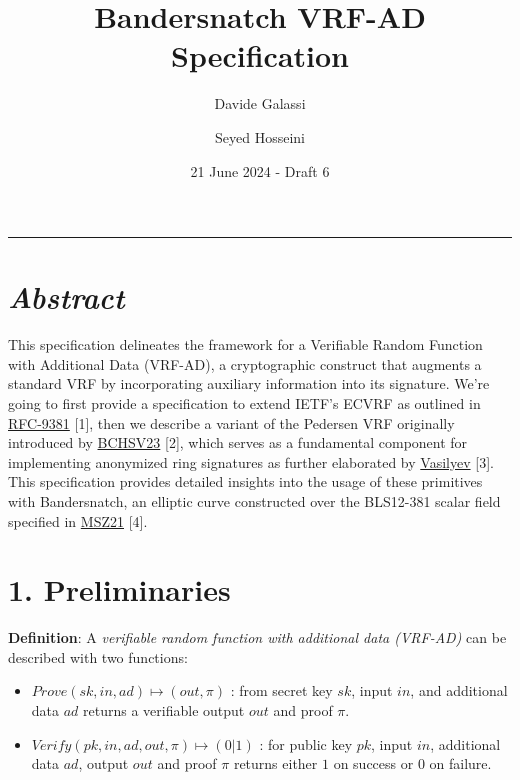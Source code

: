 \documentclass[
]{article}
\title{Bandersnatch VRF-AD Specification}
\author{Davide Galassi \and Seyed Hosseini}
\date{21 June 2024 - Draft 6}
\begin{document}
\maketitle

\newcommand{\G}{\langle G \rangle}
\newcommand{\F}{\mathbb{Z}^*_r}

\begin{center}\rule{0.5\linewidth}{0.5pt}\end{center}

\hypertarget{abstract}{%
\section{\texorpdfstring{\emph{Abstract}}{Abstract}}\label{abstract}}

This specification delineates the framework for a Verifiable Random
Function with Additional Data (VRF-AD), a cryptographic construct that
augments a standard VRF by incorporating auxiliary information into its
signature. We're going to first provide a specification to extend IETF's
ECVRF as outlined in
\href{https://datatracker.ietf.org/doc/rfc9381}{RFC-9381} {[}1{]}, then
we describe a variant of the Pedersen VRF originally introduced by
\href{https://eprint.iacr.org/2023/002}{BCHSV23} {[}2{]}, which serves
as a fundamental component for implementing anonymized ring signatures
as further elaborated by
\href{https://hackmd.io/ulW5nFFpTwClHsD0kusJAA}{Vasilyev} {[}3{]}. This
specification provides detailed insights into the usage of these
primitives with Bandersnatch, an elliptic curve constructed over the
BLS12-381 scalar field specified in
\href{https://eprint.iacr.org/2021/1152}{MSZ21} {[}4{]}.

\hypertarget{preliminaries}{%
\section{1. Preliminaries}\label{preliminaries}}

\textbf{Definition}: A \emph{verifiable random function with additional
data (VRF-AD)} can be described with two functions:

\begin{itemize}
\item
  \(Prove(sk,in,ad) \mapsto (out,\pi)\) : from secret key \(sk\), input
  \(in\), and additional data \(ad\) returns a verifiable output \(out\)
  and proof \(\pi\).
\item
  \(Verify(pk,in,ad,out,\pi) \mapsto (0|1)\) : for public key \(pk\),
  input \(in\), additional data \(ad\), output \(out\) and proof \(\pi\)
  returns either \(1\) on success or \(0\) on failure.
\end{itemize}
\end{document}
